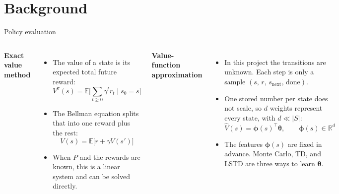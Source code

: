 \documentclass[aspectratio=169,11pt]{beamer}
\newcommand{\memberA}{Member A}
\newcommand{\speaker}[1]{} %
\newcommand{\vphi}{\bm{\phi}}
\newcommand{\vth}{\bm{\theta}}
\begin{document}
\section{Background}

\begin{frame}{Policy evaluation}
  \speaker{\memberA}
  \small
  \setlength{\abovedisplayskip}{0.3em}%
  \setlength{\belowdisplayskip}{0.25em}%
  \begin{columns}[T]
    \textbf{Exact value method}
    \begin{itemize}
      \item The value of a state is its expected total future reward:
      \[ V^\pi(s)=\mathbb{E}\Big[\sum_{t\ge 0}\gamma^t r_t \;\Big|\; s_0=s\Big] \]
      \item The Bellman equation splits that into one reward plus the rest:
      \[ V(s)=\mathbb{E}\big[r+\gamma V(s')\big] \]
      \item When $P$ and the rewards are known, this is a linear system and can be solved directly.
    \end{itemize}
    \textbf{Value-function approximation}
    \begin{itemize}
      \item In this project the transitions are unknown. Each step is only a sample $(s,\, r,\, s_{\mathrm{next}},\, \mathrm{done})$.
      \item One stored number per state does not scale, so $d$ weights represent every state, with $d\ll|S|$:
      \[ \hat V(s)=\vphi(s)^\top\vth,\qquad \vphi(s)\in\mathbb{R}^d \]
      \item The features $\vphi(s)$ are fixed in advance. Monte Carlo, TD, and LSTD are three ways to learn $\vth$.
    \end{itemize}
  \end{columns}
\end{frame}
\end{document}
